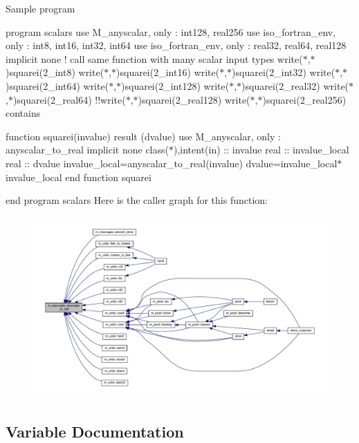 Sample program

program scalars use M\+\_\+anyscalar, only \+: int128, real256 use iso\+\_\+fortran\+\_\+env, only \+: int8, int16, int32, int64 use iso\+\_\+fortran\+\_\+env, only \+: real32, real64, real128 implicit none ! call same function with many scalar input types write($\ast$,$\ast$)squarei(2\+\_\+int8) write($\ast$,$\ast$)squarei(2\+\_\+int16) write($\ast$,$\ast$)squarei(2\+\_\+int32) write($\ast$,$\ast$)squarei(2\+\_\+int64) write($\ast$,$\ast$)squarei(2\+\_\+int128) write($\ast$,$\ast$)squarei(2\+\_\+real32) write($\ast$,$\ast$)squarei(2\+\_\+real64) !!write($\ast$,$\ast$)squarei(2\+\_\+real128) write($\ast$,$\ast$)squarei(2\+\_\+real256) contains

function squarei(invalue) result (dvalue) use M\+\_\+anyscalar, only \+: anyscalar\+\_\+to\+\_\+real implicit none class($\ast$),intent(in) \+:\+: invalue real \+:\+: invalue\+\_\+local real \+:\+: dvalue invalue\+\_\+local=anyscalar\+\_\+to\+\_\+real(invalue) dvalue=invalue\+\_\+local$\ast$invalue\+\_\+local end function squarei

end program scalars Here is the caller graph for this function\+:
\nopagebreak
\begin{figure}[H]
\begin{center}
\leavevmode
\includegraphics[width=350pt]{namespacem__anyscalar_a39cd9a778fff85974fa1a822b92555fd_icgraph}
\end{center}
\end{figure}


\subsection{Variable Documentation}
\mbox{\label{namespacem__anyscalar_a53057899b7d17505b79d9b8f5e6092a2}} 
